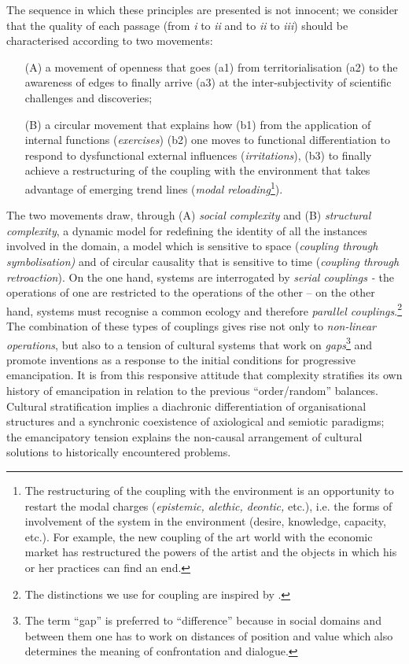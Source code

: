 \documentclass[output=paper]{langscibook}
\begin{document}
The sequence in which these principles are presented is not innocent; we consider that the quality of each passage (from \textit{i} to \textit{ii} and to \textit{ii} to \textit{iii}) should be characterised according to two movements: 

\begin{enumerate}
\item[(A)] a movement of openness that goes (a1) from territorialisation (a2) to the awareness of edges to finally arrive (a3) at the inter-subjectivity of scientific challenges and discoveries; 

\item[(B)] a circular movement that explains how (b1) from the application of internal functions (\textit{exercises}) (b2) one moves to functional differentiation to respond to dysfunctional external influences (\textit{irritations}), (b3) to finally achieve a restructuring of the coupling with the environment that takes advantage of emerging trend lines (\textit{modal reloading}\footnote{The restructuring of the coupling with the environment is an opportunity to restart the modal charges (\textit{epistemic, alethic, deontic,} etc.), i.e. the forms of involvement of the system in the environment (desire, knowledge, capacity, etc.). For example, the new coupling of the art world with the economic market has restructured the powers of the artist and the objects in which his or her practices can find an end.}).
\end{enumerate} 


The two movements draw, through (A) \textit{social complexity} and (B) \textit{structural complexity}, a dynamic model for redefining the identity of all the instances involved in the domain, a model which is sensitive to space (\textit{coupling through symbolisation)} and of circular causality that is sensitive to time (\textit{coupling through retroaction}). On the one hand, systems are interrogated by \textit{serial couplings -} the operations of one are restricted to the operations of the other -- on the other hand, systems must recognise a common ecology and therefore \textit{parallel couplings}.\footnote{The distinctions we use for coupling are inspired by \citet{Walliser1977}.} The combination of these types of couplings gives rise not only to \textit{non-linear operations}, but also to a tension of cultural systems that work on \textit{gaps}\footnote{The term “gap” is preferred to “difference” because in social domains and between them one has to work on distances of position and value which also determines the meaning of confrontation and dialogue.} and promote inventions  as a response to the initial conditions for progressive emancipation. It is from this responsive attitude that complexity stratifies its own history of emancipation in relation to the previous “order/random” balances. Cultural stratification implies a diachronic differentiation of organisational structures and a synchronic coexistence of axiological and semiotic paradigms; the emancipatory tension explains the non-causal arrangement of cultural solutions to historically encountered problems.
\end{document}
